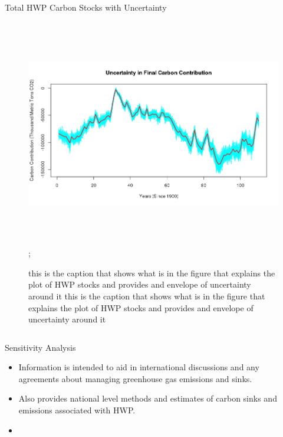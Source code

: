\documentclass[final]{beamer}\usepackage[]{graphicx}\usepackage[]{color}
\newlength{\onecolwid}
\newlength{\twocolwid}
\begin{document}
\begin{frame}[t]
\begin{columns}[t]
\begin{column}{\twocolwid}
\begin{alertblock}{Total HWP Carbon Stocks with Uncertainty}
\begin{center}
\begin{figure}
    {\includegraphics[width=1\linewidth,height=10cm]{Uncertainty_Plot.png}};
    \caption{this is the caption that shows what is in the figure that explains the plot of HWP stocks and provides and envelope of uncertainty around it
    this is the caption that shows what is in the figure that explains the plot of HWP stocks and provides and envelope of uncertainty around it}
\end{figure}
\end{center}
\end{alertblock} 


\begin{columns}[t,totalwidth=\twocolwid] %

\begin{column}{\onecolwid} %


\begin{block}{Sensitivity Analysis}
\begin{itemize}
\item Information is intended to aid in international discussions and any agreements about managing greenhouse gas emissions and sinks.
\item Also provides national level methods and estimates of carbon sinks and emissions associated with HWP.
\item 
\end{itemize}
\vspace{0ex}


\end{block}
\end{column}
\end{columns}
\end{column}
\end{columns}
\end{frame}
\end{document}
